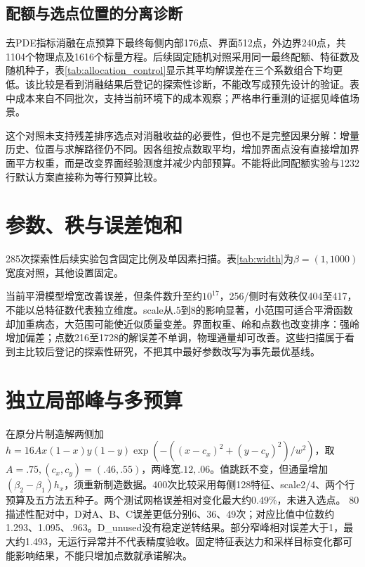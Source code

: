 \subsection{配额与选点位置的分离诊断}
去PDE指标消融在点预算下最终每侧内部176点、界面512点，外边界240点，共1104个物理点及1616个标量方程。后续固定随机对照采用同一最终配额、特征数及随机种子，表\ref{tab:allocation_control}显示其平均解误差在三个系数组合下均更低。该比较是看到消融结果后登记的探索性诊断，不能改写成预先设计的验证。表中成本来自不同批次，支持当前环境下的成本观察；严格串行重测的证据见峰值场景。
\begin{table}[htbp]\centering\caption{相同最终配额的随机对照与去PDE指标消融，五种子}\label{tab:allocation_control}\resizebox{\textwidth}{!}{}\end{table}
这个对照未支持残差排序选点对消融收益的必要性，但也不是完整因果分解：增量历史、位置与求解路径仍不同。因各组按点数取平均，增加界面点没有直接增加界面平方权重，而是改变界面经验测度并减少内部预算。不能将此同配额实验与1232行默认方案直接称为等行预算比较。

\section{参数、秩与误差饱和}
285次探索性后续实验包含固定比例及单因素扫描。表\ref{tab:width}为$\beta=(1,1000)$宽度对照，其他设置固定。
\begin{table}[htbp]\centering\caption{特征宽度敏感性，数据秩上限为总特征数}\label{tab:width}\end{table}
当前平滑模型增宽改善误差，但条件数升至约$10^{17}$，256/侧时有效秩仅404至417，不能以总特征数代表独立维度。scale从.5到8的影响显著，小范围可适合平滑函数却加重病态，大范围可能使近似质量变差。界面权重、岭和点数也改变排序：强岭增加偏差；点数216至1728的解误差不单调，物理通量却可改善。这些扫描属于看到主比较后登记的探索性研究，不把其中最好参数改写为事先最优基线。

\section{独立局部峰与多预算}
在原分片制造解两侧加$h=16A x(1-x)y(1-y)\exp(-((x-c_x)^2+(y-c_y)^2)/w^2)$，取$A=.75,(c_x,c_y)=(.46,.55)$，两峰宽$.12,.06$。值跳跃不变，但通量增加$(\beta_2-\beta_1)h_x$，须重新制造数据。400次比较采用每侧128特征、scale2/4、两个行预算及五方法五种子。两个测试网格误差相对变化最大约0.49\%，未进入选点。
80描述性配对中，D对A、B、C误差更低分别6、36、49次；对应比值中位数约1.293、1.095、.963。D\_unused没有稳定逆转结果。部分窄峰相对误差大于1，最大约1.493，无运行异常并不代表精度验收。固定特征表达力和采样目标变化都可能影响结果，不能只增加点数就承诺解决。

